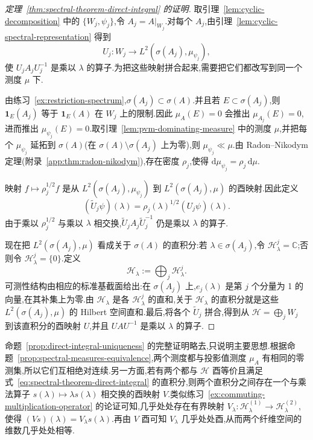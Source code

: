 \begin{proof}[定理~\ref{thm:spectral-theorem-direct-integral} 的证明]
取引理~\ref{lem:cyclic-decomposition} 中的 \(\{W_{j},\psi_{j}\}\),令 \(A_{j}=A|_{W_{j}}\).对每个 \(A_{j}\),由引理~\ref{lem:cyclic-spectral-representation} 得到
\[
U_{j}:W_{j}\to L^{2}(\sigma(A_{j}),\mu_{\psi_{j}}),
\]
使 \(U_{j}A_{j}U_{j}^{-1}\) 是乘以 \(\lambda\) 的算子.为把这些映射拼合起来,需要把它们都改写到同一个测度 \(\mu\) 下.

由练习~\ref{ex:restriction-spectrum},\(\sigma(A_{j})\subset\sigma(A)\).并且若 \(E\subset\sigma(A_{j})\),则 \(\mathbf{1}_{E}(A_{j})\) 等于 \(\mathbf{1}_{E}(A)\) 在 \(W_{j}\) 上的限制.因此 \(\mu_{A}(E)=0\) 会推出 \(\mu_{A_{j}}(E)=0\),进而推出 \(\mu_{\psi_{j}}(E)=0\).取引理~\ref{lem:pvm-dominating-measure} 中的测度 \(\mu\),并把每个 \(\mu_{\psi_{j}}\) 延拓到 \(\sigma(A)\)(在 \(\sigma(A)\setminus\sigma(A_{j})\) 上为零),则 \(\mu_{\psi_{j}}\ll\mu\).由 Radon--Nikodym 定理(附录~\ref{app:thm:radon-nikodym}),存在密度 \(\rho_{j}\),使得 \(\mathrm{d}\mu_{\psi_{j}}=\rho_{j}\,\mathrm{d}\mu\).

映射 \(f\mapsto\rho_{j}^{1/2}f\) 是从 \(L^{2}(\sigma(A_{j}),\mu_{\psi_{j}})\) 到 \(L^{2}(\sigma(A_{j}),\mu)\) 的酉映射.因此定义
\[
(\widetilde U_{j}\psi)(\lambda)=\rho_{j}(\lambda)^{1/2}(U_{j}\psi)(\lambda).
\]
由于乘以 \(\rho_{j}^{1/2}\) 与乘以 \(\lambda\) 相交换,\(\widetilde U_{j}A_{j}\widetilde U_{j}^{-1}\) 仍是乘以 \(\lambda\) 的算子.

现在把 \(L^{2}(\sigma(A_{j}),\mu)\) 看成关于 \(\sigma(A)\) 的直积分:若 \(\lambda\in\sigma(A_{j})\),令 \(\mathcal{H}_{\lambda}^{j}=\mathbb{C}\);否则令 \(\mathcal{H}_{\lambda}^{j}=\{0\}\).定义
\[
\mathcal{H}_{\lambda}:=\bigoplus_{j}\mathcal{H}_{\lambda}^{j}.
\]
可测性结构由相应的标准基截面给出:在 \(\sigma(A_{j})\) 上,\(e_{j}(\lambda)\) 是第 \(j\) 个分量为 1 的向量,在其补集上为零.由 \(\mathcal{H}_{\lambda}\) 是各 \(\mathcal{H}_{\lambda}^{j}\) 的直和,关于 \(\mathcal{H}_{\lambda}\) 的直积分就是这些 \(L^{2}(\sigma(A_{j}),\mu)\) 的 Hilbert 空间直和.最后,将各个 \(\widetilde U_{j}\) 拼合,得到从 \(\mathcal{H}=\bigoplus_{j}W_{j}\) 到该直积分的酉映射 \(U\),并且 \(UAU^{-1}\) 是乘以 \(\lambda\) 的算子.
\end{proof}

命题~\ref{prop:direct-integral-uniqueness} 的完整证明略去,只说明主要思想.根据命题~\ref{prop:spectral-measures-equivalence},两个测度都与投影值测度 \(\mu_{A}\) 有相同的零测集,所以它们互相绝对连续.另一方面,若有两个都与 \(\mathcal{H}\) 酉等价且满足式~\eqref{eq:spectral-theorem-direct-integral} 的直积分,则两个直积分之间存在一个与乘法算子 \(s(\lambda)\mapsto\lambda s(\lambda)\) 相交换的酉映射 \(V\).类似练习~\ref{ex:commuting-multiplication-operator} 的论证可知,几乎处处存在有界映射 \(V_{\lambda}:\mathcal{H}_{\lambda}^{(1)}\to\mathcal{H}_{\lambda}^{(2)}\),使得 \((Vs)(\lambda)=V_{\lambda}s(\lambda)\).再由 \(V\) 酉可知 \(V_{\lambda}\) 几乎处处酉,从而两个纤维空间的维数几乎处处相等.

